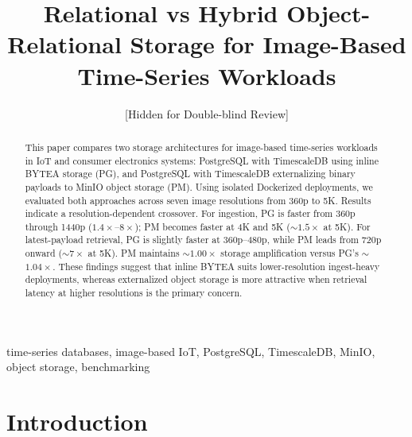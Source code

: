 \documentclass[conference, a4paper]{IEEEtran}
\begin{document}
\title{Relational vs Hybrid Object-Relational Storage for Image-Based Time-Series Workloads}

\author{
[Hidden for Double-blind Review]
}


\maketitle

\begin{abstract}
This paper compares two storage architectures for image-based time-series workloads in IoT and consumer electronics systems: PostgreSQL with TimescaleDB using inline BYTEA storage (PG), and PostgreSQL with TimescaleDB externalizing binary payloads to MinIO object storage (PM). Using isolated Dockerized deployments, we evaluated both approaches across seven image resolutions from 360p to 5K. Results indicate a resolution-dependent crossover. For ingestion, PG is faster from 360p through 1440p ($1.4\times$--$8\times$); PM becomes faster at 4K and 5K ($\sim$$1.5\times$ at 5K). For latest-payload retrieval, PG is slightly faster at 360p--480p, while PM leads from 720p onward ($\sim$$7\times$ at 5K). PM maintains $\sim$$1.00\times$ storage amplification versus PG's $\sim$$1.04\times$. These findings suggest that inline BYTEA suits lower-resolution ingest-heavy deployments, whereas externalized object storage is more attractive when retrieval latency at higher resolutions is the primary concern.
\end{abstract}

\begin{IEEEkeywords}
time-series databases, image-based IoT, PostgreSQL, TimescaleDB, MinIO, object storage, benchmarking
\end{IEEEkeywords}

\section{Introduction}
\label{sec:introduction}
\end{document}
